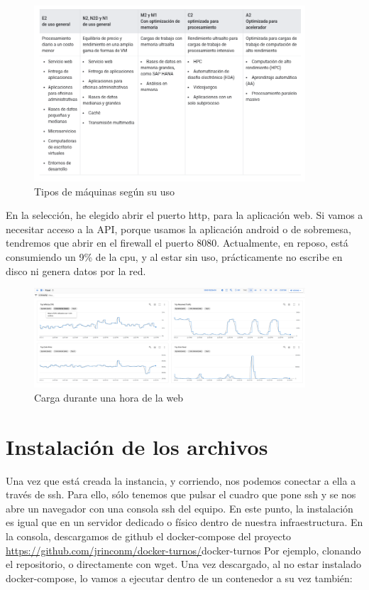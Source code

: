 \documentclass[11pt,spanish,listoffigures,listoftables]{tfgetsinf}
\begin{document}
\begin{figure}[h!] %
  \centering
   \includegraphics[width=0.90\textwidth]{img/cargas de trabajo.png}
   \caption{Tipos de máquinas según su uso}
   \label{fig:cargas}
 \end{figure}

 En la selección, he elegido abrir el puerto http, para la aplicación web. Si vamos a necesitar acceso a la API, porque usamos la aplicación android o de sobremesa, tendremos que abrir en el firewall el puerto 8080.
 Actualmente, en reposo, está consumiendo un 9\% de la cpu, y al estar sin uso, prácticamente no escribe en disco ni genera datos por la red.

 \begin{figure}[h!] %
  \centering
   \includegraphics[width=0.90\textwidth]{img/cargaGoogleCloud.png}
   \caption{Carga durante una hora de la web}
   \label{fig:cargaweb}
 \end{figure}

\section{Instalación de los archivos}

Una vez que está creada la instancia, y corriendo, nos podemos conectar a ella a través de ssh. Para ello, sólo tenemos que pulsar el cuadro que pone ssh y se nos abre un navegador con una consola ssh del equipo.
En este punto, la instalación es igual que en un servidor dedicado o físico dentro de nuestra infraestructura. En la consola, descargamos de github el docker-compose del proyecto \url{https://github.com/jrinconm/docker-turnos/}{docker-turnos}
Por ejemplo, clonando el repositorio, o directamente con wget. Una vez descargado, al no estar instalado docker-compose, lo vamos a ejecutar dentro de un contenedor a su vez también:
\end{document}
